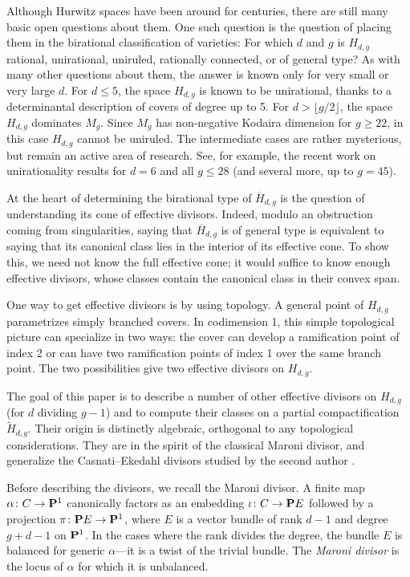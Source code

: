 \documentclass{amsart}
\renewcommand {\P}{{\bf P}}
\providecommand {\from}{{\colon}}
\numberwithin{equation}{section}
\begin{document}
Although Hurwitz spaces have been around for centuries, there are still many basic open questions about them.
One such question is the question of placing them in the birational classification of varieties:
For which $d$ and $g$ is $H_{d,g}$ rational, unirational, uniruled, rationally connected, or of general type?
As with many other questions about them, the answer is known only for very small or very large $d$.
For $d \leq 5$, the space $H_{d,g}$ is known to be unirational, thanks to a determinantal description of covers of degree up to 5.
For $d > \lfloor g/2 \rfloor$, the space $H_{d,g}$ dominates $M_g$.
Since $M_g$ has non-negative Kodaira dimension for $g \geq 22$, in this case $H_{d,g}$ cannot be uniruled.  
The intermediate cases are rather mysterious, but remain an active area of research.
See, for example, the recent work \cite{gei:12} on unirationality results for $d = 6$ and all $g \leq 28$ (and several more, up to $g = 45$).

At the heart of determining the birational type of $\overline H_{d,g}$ is the question of understanding its cone of effective divisors.
Indeed, modulo an obstruction coming from singularities, saying that $\overline H_{d,g}$ is of general type is equivalent to saying that its canonical class lies in the interior of its effective cone.
To show this, we need not know the full effective cone; it would suffice to know enough effective divisors, whose classes contain the canonical class in their convex span.

One way to get effective divisors is by using topology.
A general point of $H_{d,g}$ parametrizes simply branched covers.
In codimension 1, this simple topological picture can specialize in two ways: the cover can develop a ramification point of index 2 or can have two ramification points of index 1 over the same branch point.
The two possibilities give two effective divisors on $H_{d,g}$.

The goal of this paper is to describe a number of other effective divisors on $H_{d,g}$ (for $d$ dividing $g-1$) and to compute their classes on a partial compactification $\widetilde H_{d,g}$.
Their origin is distinctly algebraic, orthogonal to any topological considerations.
They are in the spirit of the classical Maroni divisor, and generalize the Casnati--Ekedahl divisors studied by the second author \cite{pat:15}.

Before describing the divisors, we recall the Maroni divisor.
A finite map $\alpha \from C \to \P^1$ canonically factors as an embedding $\iota \from C \to \P E$ followed by a projection $\pi \from \P E \to \P^1$, where $E$ is a vector bundle of rank $d-1$ and degree $g+d-1$ on $\P^1$.
In the cases where the rank divides the degree, the bundle $E$ is balanced for generic $\alpha$---it is a twist of the trivial bundle.
The \emph{Maroni divisor} is the locus of $\alpha$ for which it is unbalanced.
\end{document}
